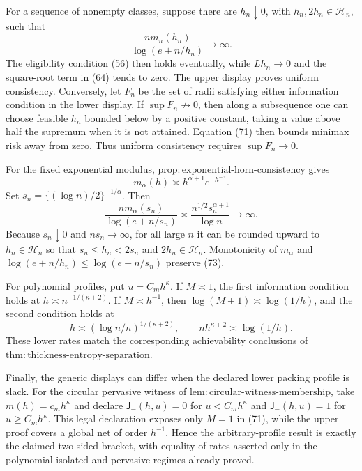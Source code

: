 For a sequence of nonempty classes, suppose there are \(h_n\downarrow0\), with \(h_n,2h_n\in\mathcal H_n\), such that
\[
 \frac{nm_n(h_n)}{\log(e+n/h_n)}\longrightarrow\infty. \tag{72}
\]
The eligibility condition (56) then holds eventually, while \(Lh_n\to0\) and the square-root term in (64) tends to zero. The upper display proves uniform consistency. Conversely, let \(F_n\) be the set of radii satisfying either information condition in the lower display. If \(\sup F_n\not\to0\), then along a subsequence one can choose feasible \(h_n\) bounded below by a positive constant, taking a value above half the supremum when it is not attained. Equation (71) then bounds minimax risk away from zero. Thus uniform consistency requires \(\sup F_n\to0\).

For the fixed exponential modulus, \(\mathrm{prop:exponential\text{-}horn\text{-}consistency}\) gives
\[
 m_\alpha(h)\asymp h^{\alpha+1}e^{-h^{-\alpha}}.
\]
Set \(s_n=\{(\log n)/2\}^{-1/\alpha}\). Then
\[
 \frac{nm_\alpha(s_n)}{\log(e+n/s_n)}
 \asymp\frac{n^{1/2}s_n^{\alpha+1}}{\log n}
 \longrightarrow\infty. \tag{73}
\]
Because \(s_n\downarrow0\) and \(ns_n\to\infty\), for all large \(n\) it can be rounded upward to \(h_n\in\mathcal H_n\) so that \(s_n\le h_n<2s_n\) and \(2h_n\in\mathcal H_n\). Monotonicity of \(m_\alpha\) and \(\log(e+n/h_n)\le\log(e+n/s_n)\) preserve (73).

For polynomial profiles, put \(u=C_mh^\kappa\). If \(M\asymp1\), the first information condition holds at \(h\asymp n^{-1/(\kappa+2)}\). If \(M\asymp h^{-1}\), then \(\log(M+1)\asymp\log(1/h)\), and the second condition holds at
\[
 h\asymp(\log n/n)^{1/(\kappa+2)},
 \qquad nh^{\kappa+2}\asymp\log(1/h).
\]
These lower rates match the corresponding achievability conclusions of \(\mathrm{thm:thickness\text{-}entropy\text{-}separation}\).

Finally, the generic displays can differ when the declared lower packing profile is slack. For the circular pervasive witness of \(\mathrm{lem:circular\text{-}witness\text{-}membership}\), take \(m(h)=c_mh^\kappa\) and declare \(\mathsf J_{-}(h,u)=0\) for \(u<C_mh^\kappa\) and \(\mathsf J_{-}(h,u)=1\) for \(u\ge C_mh^\kappa\). This legal declaration exposes only \(M=1\) in (71), while the upper proof covers a global net of order \(h^{-1}\). Hence the arbitrary-profile result is exactly the claimed two-sided bracket, with equality of rates asserted only in the polynomial isolated and pervasive regimes already proved.